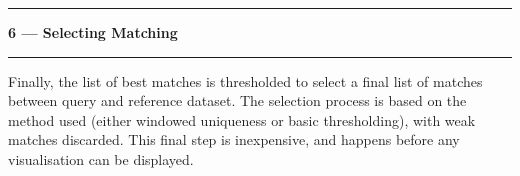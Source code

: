 \noindent\rule{\textwidth}{1pt}
\indent \textbf{6 --- Selecting Matching}
\noindent\rule{\textwidth}{1pt}
\smallskip
\parbox{\textwidth}{Finally, the list of best matches is thresholded to select a final list of matches between query and reference dataset. The selection process is based on the method used (either windowed uniqueness or basic thresholding), with weak matches discarded. This final step is inexpensive, and happens before any visualisation can be displayed.}
\smallskip
